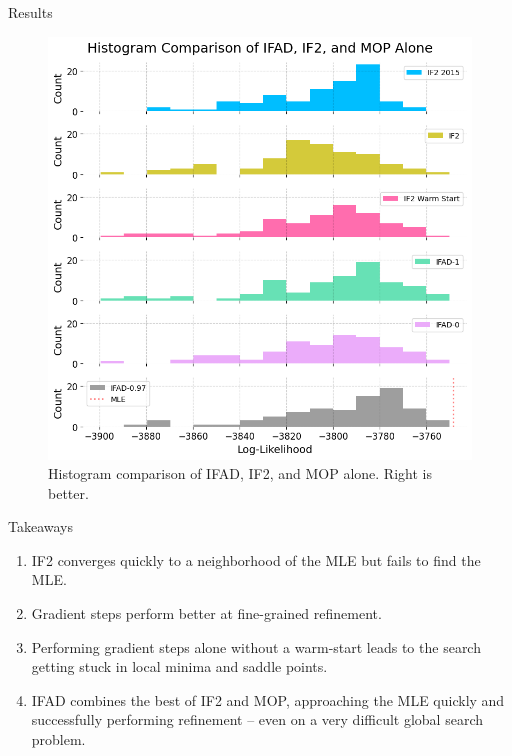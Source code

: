 \documentclass{beamer}
\begin{document}
\begin{frame}{Results}
    
\begin{figure}[u!]
    \centering
    \includegraphics[scale=0.35]{imgs/095/hist.png}
    \caption{Histogram comparison of IFAD, IF2, and MOP alone. Right is better.}
    \label{fig:hist-all}
\end{figure}
\end{frame}

\begin{frame}{Takeaways}
    \begin{enumerate}
        \item IF2 converges quickly to a neighborhood of the MLE but fails to find the MLE.
        \item \pause Gradient steps perform better at fine-grained refinement.
        \item \pause Performing gradient steps alone without a warm-start leads to the search getting stuck in local minima and saddle points.
        \item \pause IFAD combines the best of IF2 and MOP, approaching the MLE quickly and successfully performing refinement -- even on a very difficult global search problem.
    \end{enumerate}
\end{frame}
\end{document}
